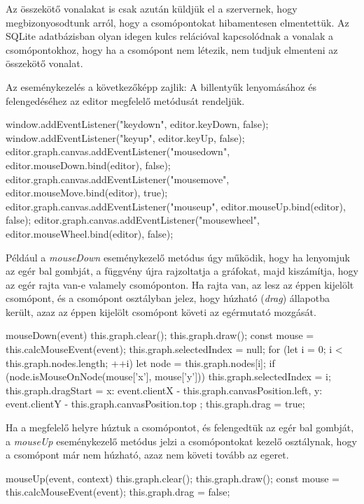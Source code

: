 Az összekötő vonalakat is csak azután küldjük el a szervernek, hogy megbizonyosodtunk arról, hogy a csomópontokat hibamentesen elmentettük. Az SQLite adatbázisban olyan idegen kulcs relációval kapcsolódnak a vonalak a csomópontokhoz, hogy ha a csomópont nem létezik, nem tudjuk elmenteni az összekötő vonalat.
 
Az eseménykezelés a következőképp zajlik: A billentyűk lenyomásához és felengedéséhez az editor megfelelő metódusát rendeljük.

\begin{javascript}
window.addEventListener("keydown", editor.keyDown, false);
window.addEventListener("keyup", editor.keyUp, false);
editor.graph.canvas.addEventListener("mousedown", editor.mouseDown.bind(editor), false);
editor.graph.canvas.addEventListener("mousemove", editor.mouseMove.bind(editor), true);
editor.graph.canvas.addEventListener("mouseup", editor.mouseUp.bind(editor), false);
editor.graph.canvas.addEventListener("mousewheel", editor.mouseWheel.bind(editor), false);
\end{javascript}
 
Például a \textit{mouseDown} eseménykezelő metódus úgy működik, hogy ha lenyomjuk az egér bal gombját, a függvény újra rajzoltatja a gráfokat, majd kiszámítja, hogy az egér rajta van-e valamely csomóponton. Ha rajta van, az lesz az éppen kijelölt csomópont, és a csomópont osztályban jelez, hogy húzható (\textit{drag}) állapotba került, azaz az éppen kijelölt csomópont követi az egérmutató mozgását.

\begin{javascript}
mouseDown(event)
{
   this.graph.clear();
   this.graph.draw();
   const mouse = this.calcMouseEvent(event);
   this.graph.selectedIndex = null;
   for (let i = 0; i < this.graph.nodes.length; ++i) {
       let node = this.graph.nodes[i];
       if (node.isMouseOnNode(mouse['x'], mouse['y'])){
           this.graph.selectedIndex = i;
       }
   }
   this.graph.dragStart = {
       x: event.clientX - this.graph.canvasPosition.left,
       y: event.clientY - this.graph.canvasPosition.top
   };
   this.graph.drag = true;
}
\end{javascript}

 
Ha a megfelelő helyre húztuk a csomópontot, és felengedtük az egér bal gombját, a \textit{mouseUp} eseménykezelő metódus jelzi a csomópontokat kezelő osztálynak, hogy a csomópont már nem húzható, azaz nem követi tovább az egeret.

\begin{javascript}
mouseUp(event, context)
{
   this.graph.clear();
   this.graph.draw();
   const mouse = this.calcMouseEvent(event);
   this.graph.drag = false;
}
\end{javascript}

